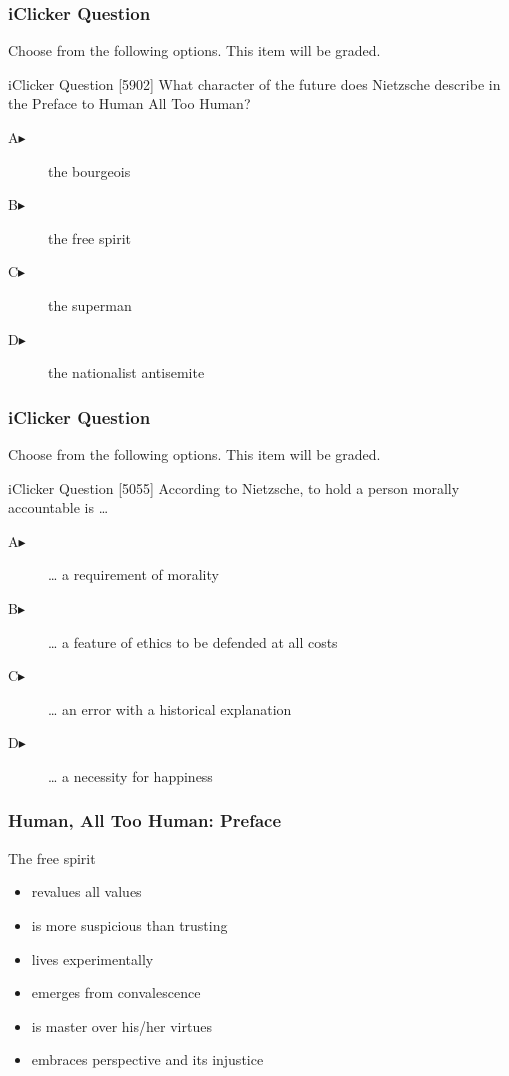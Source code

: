 \documentclass[xcolor=dvipsnames]{beamer}
\begin{document}
\begin{frame}
  \frametitle{iClicker Question}
Choose from the following options. This item will be graded.
\begin{block}{iClicker Question}
[5902] What character of the future does Nietzsche describe in the
Preface to Human All Too Human?
\end{block}
\begin{description}
\item[A\hspace{.2in}$\blacktriangleright$] the bourgeois
\item[B\hspace{.2in}$\blacktriangleright$] the free spirit
\item[C\hspace{.2in}$\blacktriangleright$] the superman
\item[D\hspace{.2in}$\blacktriangleright$] the nationalist antisemite
\end{description}
\end{frame}

\begin{frame}
  \frametitle{iClicker Question}
Choose from the following options. This item will be graded.
\begin{block}{iClicker Question}
[5055] According to Nietzsche, to hold a person morally accountable is {\ldots}
\end{block}
\begin{description}
\item[A\hspace{.2in}$\blacktriangleright$] {\ldots} a requirement of morality
\item[B\hspace{.2in}$\blacktriangleright$] {\ldots} a feature of ethics to be defended at all costs
\item[C\hspace{.2in}$\blacktriangleright$] {\ldots} an error with a historical explanation
\item[D\hspace{.2in}$\blacktriangleright$] {\ldots} a necessity for happiness
\end{description}
\end{frame}

\begin{frame}
  \frametitle{Human, All Too Human: Preface}
  The free spirit
  \begin{itemize}
  \item revalues all values
  \item is more suspicious than trusting
  \item lives experimentally
  \item emerges from convalescence
  \item is master over his/her virtues
  \item embraces perspective and its injustice
  \end{itemize}
\end{frame}
\end{document}
